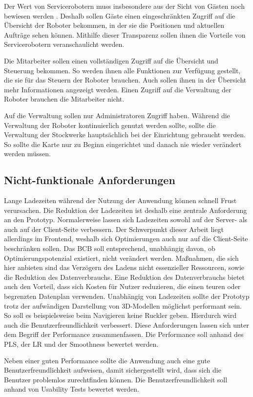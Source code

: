 Der Wert von Servicerobotern muss insbesondere aus der Sicht von Gästen noch bewiesen werden \cite[S.~429]{Paluch2020}. Deshalb sollen Gäste einen eingeschränkten Zugriff auf die Übersicht der Roboter bekommen, in der sie die Positionen und aktuellen Aufträge sehen können. Mithilfe dieser Transparenz sollen ihnen die Vorteile von Servicerobotern veranschaulicht werden.

Die Mitarbeiter sollen einen vollständigen Zugriff auf die Übersicht und Steuerung bekommen. So werden ihnen alle Funktionen zur Verfügung gestellt, die sie für das Steuern der Roboter brauchen. Auch sollen ihnen in der Übersicht mehr Informationen angezeigt werden. Einen Zugriff auf die Verwaltung der Roboter brauchen die Mitarbeiter nicht.

Auf die Verwaltung sollen nur Administratoren Zugriff haben. Während die Verwaltung der Roboter kontinuierlich genutzt werden sollte, sollte die Verwaltung der Stockwerke hauptsächlich bei der Einrichtung gebraucht werden. So sollte die Karte nur zu Beginn eingerichtet und danach nie wieder verändert werden müssen.

\subsection{Nicht-funktionale Anforderungen}
Lange Ladezeiten während der Nutzung der Anwendung können schnell Frust verursachen. Die Reduktion der Ladezeiten ist deshalb eine zentrale Anforderung an den Prototyp. Normalerweise lassen sich Ladezeiten sowohl auf der Server- als auch auf der Client-Seite verbessern. Der Schwerpunkt dieser Arbeit liegt allerdings im Frontend, weshalb sich Optimierungen auch nur auf die Client-Seite beschränken sollen. Das \ac{BCB} soll entsprechend, unabhängig davon, ob Optimierungspotenzial existiert, nicht verändert werden. Maßnahmen, die sich hier anbieten sind das Verzögern des Ladens nicht essenzieller Ressourcen, sowie die Reduktion des Datenverbrauchs. Eine Reduktion des Datenverbrauchs bietet auch den Vorteil, dass sich Kosten für Nutzer reduzieren, die einen teuren oder begrenzten Datenplan verwenden. Unabhängig von Ladezeiten sollte der Prototyp trotz der aufwändigen Darstellung von 3D-Modellen möglichst performant sein. So soll es beispielsweise beim Navigieren keine Ruckler geben. Hierdurch wird auch die Benutzerfreundlichkeit verbessert. Diese Anforderungen lassen sich unter dem Begriff der Performance zusammenfassen. Die Performance soll anhand des \ac{PLS}, der \ac{LR} und der Smoothness bewertet werden.

Neben einer guten Performance sollte die Anwendung auch eine gute Benutzerfreundlichkeit aufweisen, damit sichergestellt wird, dass sich die Benutzer problemlos zurechtfinden können. Die Benutzerfreundlichkeit soll anhand von Usability Tests bewertet werden.
